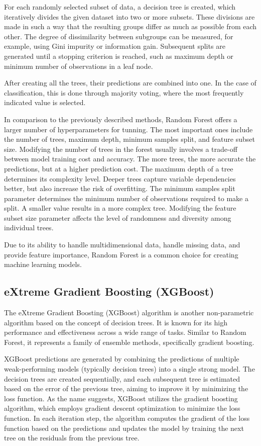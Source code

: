 For each randomly selected subset of data, a decision tree is created, which iteratively divides the given dataset into two or more subsets. These divisions are made in such a way that the resulting groups differ as much as possible from each other. The degree of dissimilarity between subgroups can be measured, for example, using Gini impurity or information gain. Subsequent splits are generated until a stopping criterion is reached, such as maximum depth or minimum number of observations in a leaf node.

After creating all the trees, their predictions are combined into one. In the case of classification, this is done through majority voting, where the most frequently indicated value is selected.

In comparison to the previously described methods, Random Forest offers a larger number of hyperparameters for tunning. The most important ones include the number of trees, maximum depth, minimum samples split, and feature subset size. Modifying the number of trees in the forest usually involves a trade-off between model training cost and accuracy. The more trees, the more accurate the predictions, but at a higher prediction cost. The maximum depth of a tree determines its complexity level. Deeper trees capture variable dependencies better, but also increase the risk of overfitting. The minimum samples split parameter determines the minimum number of observations required to make a split. A smaller value results in a more complex tree. Modifying the feature subset size parameter affects the level of randomness and diversity among individual trees.

Due to its ability to handle multidimensional data, handle missing data, and provide feature importance, Random Forest is a common choice for creating machine learning models.

\subsection{eXtreme Gradient Boosting (XGBoost)}
The eXtreme Gradient Boosting (XGBoost) algorithm is another non-parametric algorithm based on the concept of decision trees. It is known for its high performance and effectiveness across a wide range of tasks. Similar to Random Forest, it represents a family of ensemble methods, specifically gradient boosting.

XGBoost predictions are generated by combining the predictions of multiple weak-performing models (typically decision trees) into a single strong model. The decision trees are created sequentially, and each subsequent tree is estimated based on the error of the previous tree, aiming to improve it by minimizing the loss function. As the name suggests, XGBoost utilizes the gradient boosting algorithm, which employs gradient descent optimization to minimize the loss function. In each iteration step, the algorithm computes the gradient of the loss function based on the predictions and updates the model by training the next tree on the residuals from the previous tree.


